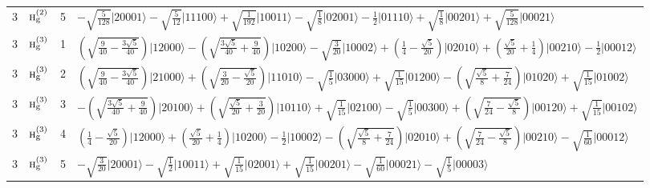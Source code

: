 \documentclass[11pt]{article}
\newcommand{\irr}[1]{\text{\normalfont\scshape #1}}
\newcommand{\ptag}[1]{\mathrm{#1}}
\newcommand{\occ}[1]{\lvert #1\rangle}
\begin{document}
\begin{longtable}{c l c p{}}
3 & $\irr{h}_{\ptag{g}}^{(2)}$ & 5 & $-\sqrt{\tfrac{5}{128}}\occ{20001}-\sqrt{\tfrac{5}{12}}\occ{11100}+\sqrt{\tfrac{1}{192}}\occ{10011}-\sqrt{\tfrac{1}{8}}\occ{02001}-\tfrac{1}{2}\occ{01110}+\sqrt{\tfrac{1}{8}}\occ{00201}+\sqrt{\tfrac{5}{128}}\occ{00021}$\\
3 & $\irr{h}_{\ptag{g}}^{(3)}$ & 1 & $(\sqrt{\frac{9}{40} - \frac{3 \sqrt{5}}{40}})\occ{12000}-(\sqrt{\frac{3 \sqrt{5}}{40} + \frac{9}{40}})\occ{10200}-\sqrt{\tfrac{3}{20}}\occ{10002}+(\frac{1}{4} - \frac{\sqrt{5}}{20})\occ{02010}+(\frac{\sqrt{5}}{20} + \frac{1}{4})\occ{00210}-\tfrac{1}{2}\occ{00012}$\\
3 & $\irr{h}_{\ptag{g}}^{(3)}$ & 2 & $(\sqrt{\frac{9}{40} - \frac{3 \sqrt{5}}{40}})\occ{21000}+(\sqrt{\frac{3}{20} - \frac{\sqrt{5}}{20}})\occ{11010}-\sqrt{\tfrac{1}{5}}\occ{03000}+\sqrt{\tfrac{1}{15}}\occ{01200}-(\sqrt{\frac{\sqrt{5}}{8} + \frac{7}{24}})\occ{01020}+\sqrt{\tfrac{1}{15}}\occ{01002}$\\
3 & $\irr{h}_{\ptag{g}}^{(3)}$ & 3 & $-(\sqrt{\frac{3 \sqrt{5}}{40} + \frac{9}{40}})\occ{20100}+(\sqrt{\frac{\sqrt{5}}{20} + \frac{3}{20}})\occ{10110}+\sqrt{\tfrac{1}{15}}\occ{02100}-\sqrt{\tfrac{1}{5}}\occ{00300}+(\sqrt{\frac{7}{24} - \frac{\sqrt{5}}{8}})\occ{00120}+\sqrt{\tfrac{1}{15}}\occ{00102}$\\
3 & $\irr{h}_{\ptag{g}}^{(3)}$ & 4 & $(\frac{1}{4} - \frac{\sqrt{5}}{20})\occ{12000}+(\frac{\sqrt{5}}{20} + \frac{1}{4})\occ{10200}-\tfrac{1}{2}\occ{10002}-(\sqrt{\frac{\sqrt{5}}{8} + \frac{7}{24}})\occ{02010}+(\sqrt{\frac{7}{24} - \frac{\sqrt{5}}{8}})\occ{00210}-\sqrt{\tfrac{1}{60}}\occ{00012}$\\
3 & $\irr{h}_{\ptag{g}}^{(3)}$ & 5 & $-\sqrt{\tfrac{3}{20}}\occ{20001}-\sqrt{\tfrac{1}{2}}\occ{10011}+\sqrt{\tfrac{1}{15}}\occ{02001}+\sqrt{\tfrac{1}{15}}\occ{00201}-\sqrt{\tfrac{1}{60}}\occ{00021}-\sqrt{\tfrac{1}{5}}\occ{00003}$\\
\hline
\end{longtable}
\end{document}
